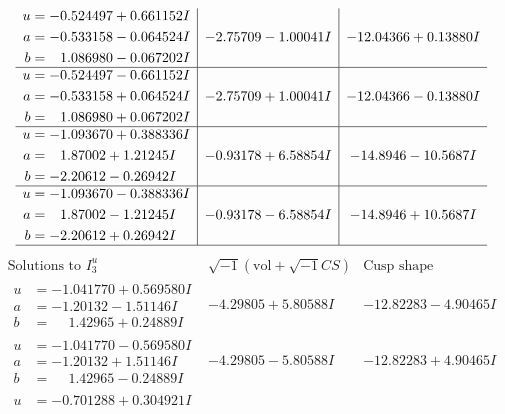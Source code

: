 \documentclass[1p]{elsarticle_modified}
\theoremstyle{definition}
\newcommand{\I}{\sqrt{-1}}
\begin{document}
$$\begin{array}{c|c|c}
\begin{aligned}
u &= -0.524497 + 0.661152 I \\
a &= -0.533158 - 0.064524 I \\
b &= \phantom{-}1.086980 - 0.067202 I\end{aligned}
 & -2.75709 - 1.00041 I & -12.04366 + 0.13880 I \\ \hline\begin{aligned}
u &= -0.524497 - 0.661152 I \\
a &= -0.533158 + 0.064524 I \\
b &= \phantom{-}1.086980 + 0.067202 I\end{aligned}
 & -2.75709 + 1.00041 I & -12.04366 - 0.13880 I \\ \hline\begin{aligned}
u &= -1.093670 + 0.388336 I \\
a &= \phantom{-}1.87002 + 1.21245 I \\
b &= -2.20612 - 0.26942 I\end{aligned}
 & -0.93178 + 6.58854 I & -14.8946 - 10.5687 I \\ \hline\begin{aligned}
u &= -1.093670 - 0.388336 I \\
a &= \phantom{-}1.87002 - 1.21245 I \\
b &= -2.20612 + 0.26942 I\end{aligned}
 & -0.93178 - 6.58854 I & -14.8946 + 10.5687 I\\
 \hline 
 \end{array}$$\newpage$$\begin{array}{c|c|c}  
\text{Solutions to }I^u_{3}& \I (\text{vol} + \sqrt{-1}CS) & \text{Cusp shape}\\
 \hline 
\begin{aligned}
u &= -1.041770 + 0.569580 I \\
a &= -1.20132 - 1.51146 I \\
b &= \phantom{-}1.42965 + 0.24889 I\end{aligned}
 & -4.29805 + 5.80588 I & -12.82283 - 4.90465 I \\ \hline\begin{aligned}
u &= -1.041770 - 0.569580 I \\
a &= -1.20132 + 1.51146 I \\
b &= \phantom{-}1.42965 - 0.24889 I\end{aligned}
 & -4.29805 - 5.80588 I & -12.82283 + 4.90465 I \\ \hline\begin{aligned}
u &= -0.701288 + 0.304921 I \\

\end{aligned}
\end{array}$$
\end{document}
